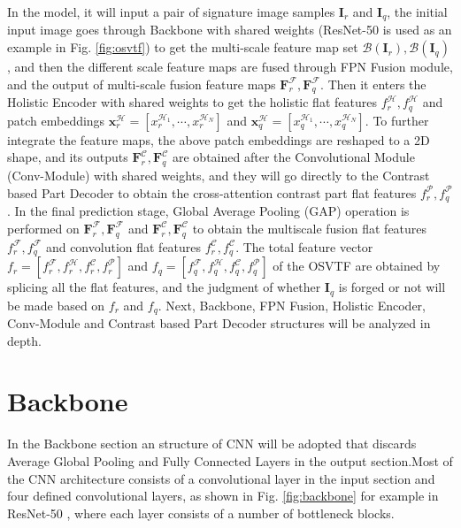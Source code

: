 In the model, it will input a pair of signature image samples $\mathbf{I}_r$ and $\mathbf{I}_q$, the initial input image goes through Backbone with shared weights (ResNet-50 \cite{14} is used as an example in Fig. \ref{fig:osvtf}) to get the multi-scale feature map set $\mathcal{B}(\mathbf{I}_r),\mathcal{B}(\mathbf{I}_q)$, and then the different scale feature maps are fused through FPN Fusion module, and the output of multi-scale fusion feature maps $\mathbf{F}_r^\mathcal{F},\mathbf{F}_q^\mathcal{F}$. Then it enters the Holistic Encoder with shared weights to get the holistic flat features $f_r^\mathcal{H},f_q^\mathcal{H}$ and patch embeddings $\boldsymbol{x}_r^\mathcal{H}=[x_r^{\mathcal{H}_1 }, \cdots, x_r^{\mathcal{H}_N} ]$ and $\boldsymbol{x}_q^\mathcal{H} = [ x_q^{\mathcal{H}_1}, \cdots, x_q^{\mathcal{H}_N} ]$. To further integrate the feature maps, the above patch embeddings are reshaped to a 2D shape, and its outputs $\mathbf{F}_r^\mathcal{C}, \mathbf{F}_q^\mathcal{C}$ are obtained after the Convolutional Module (Conv-Module) with shared weights, and they will go directly to the Contrast based Part Decoder to obtain the cross-attention contrast part flat features $f_r^\mathcal{P},f_q^\mathcal{P}$. In the final prediction stage, Global Average Pooling (GAP) operation is performed on $\mathbf{F}_r^\mathcal{F},\mathbf{F}_q^\mathcal{F}$ and $\mathbf{F}_r^\mathcal{C},\mathbf{F}_q^\mathcal{C}$ to obtain the multiscale fusion flat features $f_r^\mathcal{F},f_q^\mathcal{F}$ and convolution flat features $f_r^\mathcal{C},f_q^\mathcal{C}$. The total feature vector $f_r=[f_r^\mathcal{F},f_r^\mathcal{H},f_r^\mathcal{C},f_r^\mathcal{P} ]$ and $f_q=[f_q^\mathcal{F},f_q^\mathcal{H},f_q^\mathcal{C},f_q^\mathcal{P} ]$ of the OSVTF are obtained by splicing all the flat features, and the judgment of whether $\mathbf{I}_q$ is forged or not will be made based on $f_r$ and $f_q$. Next, Backbone, FPN Fusion, Holistic Encoder, Conv-Module and Contrast based Part Decoder structures will be analyzed in depth.

\section{Backbone}

In the Backbone section an structure of CNN will be adopted that discards Average Global Pooling and Fully Connected Layers in the output section.Most of the CNN architecture consists of a convolutional layer in the input section and four defined convolutional layers, as shown in Fig. \ref{fig:backbone} for example in ResNet-50 \cite{14}, where each layer consists of a number of bottleneck blocks. 

